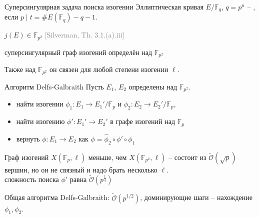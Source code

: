 \documentclass{beamer}
\begin{document}
\begin{frame}{Суперсингулярная задача поиска изогении}
	Эллиптическая кривая $E/\mathbb{F}_{q}$, $q=p^n$ -- , если $p \mid t = \#E(\mathbb{F}_q) - q- 1$.
	
	\vspace{1em}

	 $j(E) \in \mathbb{F}_{p^2}$ \hspace{8em} \textcolor{gray}{[Silverman, Th. 3.1.(a).iii]}
	
	\vspace{1em}
	\structure{$\implies$} суперсингулярный граф изогений определён над $\mathbb{F}_{p^2}$
	
	\vspace{1em}
	Также над $\mathbb{F}_{p^2}$ он связен для любой степени изогении $\ell$.
\end{frame}

\begin{frame}{Алгоритм Delfs-Galbraith}
	Пусть $E_1$, $E_2$ определены над $\mathbb{F}_{p^2}$.
	\vspace{1em}
	
	\begin{itemize}
		\item найти изогении $\phi_1: E_1 \rightarrow E_1'/\mathbb{F}_p$ и $\phi_2: E_2 \rightarrow E_2'/\mathbb{F}_p$,
		\item найти изогению $\phi': E_1' \rightarrow E_2'$ в графе изогений над $\mathbb{F}_p$
		\item вернуть $\phi: E_1 \rightarrow E_2$ как $\phi = \widehat{\phi}_2 \circ \phi' \circ \phi_1$
	\end{itemize}

\end{frame}

\begin{frame}
	Граф изогений $X(\mathbb{F}_p, \ell)$ меньше, чем $X(\mathbb{F}_{p^2}, \ell)$ -- состоит из $\widetilde{\mathcal{O}}(\sqrt{p})$ вершин, но он не связный и надо брать несколько $\ell$.
	\\
	\structure{$\implies$} сложность поиска $\phi'$ равна $\widetilde{\mathcal{O}}(p^\frac{1}{4})$
	
	\vspace{1em}
	Общая  алгоритма Delfs-Galbraith: $\widetilde{\mathcal{O}}(p^{1/2})$, доминирующие шаги -- нахождение $\phi_1, \phi_2$.
\end{frame}
\end{document}
